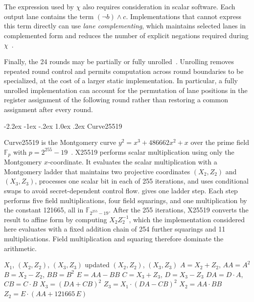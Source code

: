 \documentclass[journal=tches,submission]{iacrtrans}
\makeatletter
\renewcommand\subsection{\@startsection{subsection}{2}{\z@}%
      {-2.2ex \@plus -1ex \@minus -.2ex}%
      {1.0ex \@plus .2ex}%
      {\normalfont\large\bfseries\SS@subsectfont}}
\makeatother
\begin{document}
The expression used by $\chi$ also requires consideration in scalar software.
Each output lane contains the term $(\lnot b)\land c$.
Implementations that cannot express this term directly can use \emph{lane complementing}, which maintains selected lanes in complemented form and reduces the number of explicit negations required during $\chi$~\cite{KeccakImplementation}.

Finally, the 24 rounds may be partially or fully unrolled~\cite{KeccakImplementation}.
Unrolling removes repeated round control and permits computation across round boundaries to be specialized, at the cost of a larger static implementation.
In particular, a fully unrolled implementation can account for the permutation of lane positions in the register assignment of the following round rather than restoring a common assignment after every round.

\subsection{Curve25519}
\label{sec:background-curve25519}

Curve25519 is the Montgomery curve $y^2 = x^3 + 486662x^2 + x$ over the prime field $\mathbb{F}_p$ with $p = 2^{255}-19$~\cite{PKC:Bernstein06}.
X25519 performs scalar multiplication using only the Montgomery $x$-coordinate.
It evaluates the scalar multiplication with a Montgomery ladder that maintains two projective coordinates $(X_2,Z_2)$ and $(X_3,Z_3)$, processes one scalar bit in each of 255 iterations, and uses conditional swaps to avoid secret-dependent control flow.
 gives one ladder step.
Each step performs five field multiplications, four field squarings, and one multiplication by the constant 121665, all in $\mathbb{F}_{2^{255}-19}$.
After the 255 iterations, X25519 converts the result to affine form by computing $X_2 Z_2^{-1}$, which the implementation considered here evaluates with a fixed addition chain of 254 further squarings and 11 multiplications.
Field multiplication and squaring therefore dominate the arithmetic.

\begin{algorithm}[!ht]
\caption{One Montgomery ladder step for X25519~\cite{PKC:Bernstein06}. All operations are in $\mathbb{F}_{2^{255}-19}$, and $X_1$ is the affine input coordinate.}
\label{alg:ladder}
\begin{algorithmic}[1]
\Require $X_1$, $(X_2,Z_2)$, $(X_3,Z_3)$
\Ensure updated $(X_2,Z_2)$, $(X_3,Z_3)$
\State $A = X_2 + Z_2$, \quad $AA = A^2$
\State $B = X_2 - Z_2$, \quad $BB = B^2$
\State $E = AA - BB$
\State $C = X_3 + Z_3$, \quad $D = X_3 - Z_3$
\State $DA = D\cdot A$, \quad $CB = C\cdot B$
\State $X_3 = (DA + CB)^2$
\State $Z_3 = X_1\cdot(DA - CB)^2$
\State $X_2 = AA\cdot BB$
\State $Z_2 = E\cdot(AA + 121665\,E)$
\end{algorithmic}
\end{algorithm}
\end{document}
